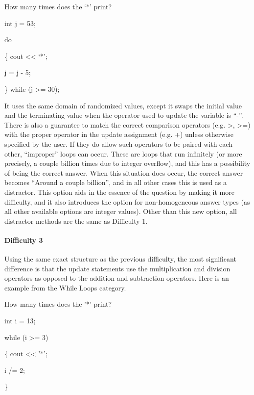 \documentclass{article}
\begin{document}
\hfill \par
How many times does the `*' print? \par
int j = 53; \par
do \par
\{
\indent\indent cout \textless\textless{} `*'; \par
\indent\indent j = j - 5; \par
\} while (j \textgreater = 30); \par
\hfill \par

 It uses the same domain of randomized values, except it swaps the initial value and the terminating value when the operator used to update the variable is ``-''. There is also a 
guarantee to match the correct comparison operators (e.g. \textgreater, \textgreater =) with the proper operator in the update assignment (e.g. +) unless otherwise specified by the user.
If they do allow such operators to be paired with each other, ``improper'' loops can occur. These are loops that run infinitely (or more precisely, a couple billion times due to integer overflow), 
and this has a possibility of being the correct answer. When this situation does occur, the correct answer becomes ``Around a couple billion'', and in all other cases this is used as a distractor. This 
option aids in the essence of the question by making it more difficulty, and it also introduces the option for non-homogeneous answer types (as all other available options are integer values). 
Other than this new option, all distractor methods are the same as Difficulty 1.

\paragraph{Difficulty 3} \hfill \par
Using the same exact structure as the previous difficulty, the most significant difference is that the update statements use the multiplication and division operators as opposed to the addition
and subtraction operators. Here is an example from the While Loops category.

\hfill \par
How many times does the '*' print? \par
int i = 13; \par
while (i \textgreater = 3) \par
\{
\indent\indent cout \textless\textless{} '*'; \par
\indent\indent i /= 2; \par
\}
\end{document}
